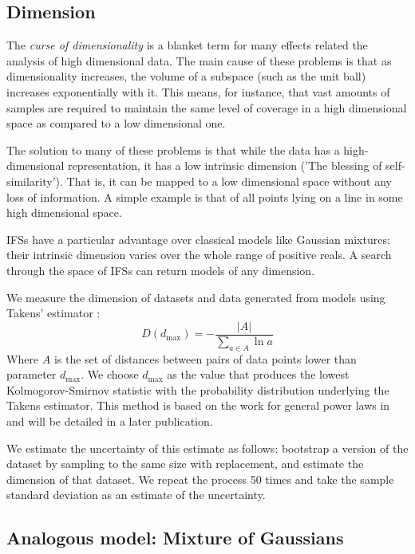 \documentclass[10pt,a4paper,oneside]{article}
\theoremstyle{definition}
\begin{document}
\subsection*{Dimension}

The \textit{curse of dimensionality} is a blanket term for many effects related the analysis of high dimensional data. The main cause of these problems is that as dimensionality increases, the volume of a subspace (such as the unit ball) increases exponentially with it. This means, for instance, that vast amounts of samples are required to maintain the same level of coverage in a high dimensional space as compared to a low dimensional one. 

The solution to many of these problems is that while the data has a high-dimensional representation, it has a low intrinsic dimension ('The blessing of self-similarity'). That is, it can be mapped to a low dimensional space without any loss of information. A simple example is that of all points lying on a line in some high dimensional space. 

IFSs have a particular advantage over classical models like Gaussian mixtures: their intrinsic dimension varies over the whole range of positive reals. A search through the space of IFSs can return models of any dimension.

We measure the dimension of datasets and data generated from models using Takens' estimator \cite{takens1985numerical}:
\[
D(d_{\mbox{max}}) = -\frac{|A|}{\sum_{a \in A} \ln a} 
\]
Where $A$ is the set of distances between pairs of data points lower than parameter $d_{\mbox{max}}$. We choose $d_{\mbox{max}}$ as the value that produces the lowest Kolmogorov-Smirnov statistic with the probability distribution underlying the Takens estimator. This method is based on the work for general power laws in \cite{clauset2009power} and will be detailed in a later publication. 

We estimate the uncertainty of this estimate as follows: bootstrap a version of the dataset by sampling to the same size with replacement, and estimate the dimension of that dataset. We repeat the process 50 times and take the sample standard deviation as an estimate of the uncertainty.

\subsection*{Analogous model: Mixture of Gaussians}
\end{document}
